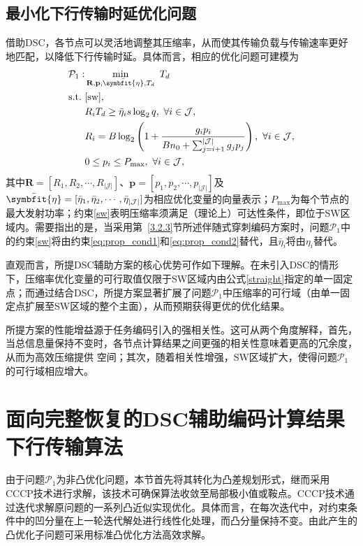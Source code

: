 \subsection{最小化下行传输时延优化问题}
借助DSC，各节点可以灵活地调整其压缩率，从而使其传输负载与传输速率更好地匹配，以降低下行传输时延。具体而言，相应的优化问题可建模为
\begin{align}
	\mathcal{P}_1:& \min_{\mathbf{R},\mathbf{p}, \bar{\symbfit{\eta}},T_d} ~T_{d}\\
	\text{s.t.}~ &\eqref{sw}\notag,\\
	&R_{i}T_d\geq \bar{\eta}_i s\log_2q,~ \forall i\in \mathcal{J},\label{sw_rt>r'}\\
	&R_i= B\log_2\left(1+\frac{g_ip_i}{Bn_0+\sum_{j=i+1}^{|\mathcal{J}|}g_jp_j}\right)\label{sic_j},~\forall i\in\mathcal{J},\\
	& 0\leq p_i\leq P_{\max}, ~\forall i\in \mathcal{J},\label{pi}
\end{align}
 其中$\mathbf{R} = [R_1, R_2, \cdots, R_{|\mathcal{J}|}]$、$\mathbf{p} = [p_1, p_2, \cdots, p_{|\mathcal{J}|}]$及$\bar{\symbfit{\eta}} = [\bar{\eta}_1, \bar{\eta}_2, \cdots, \bar{\eta}_{|\mathcal{J}|}]$为相应优化变量的向量表示；$P_{\max}$为每个节点的最大发射功率；约束\eqref{sw}表明压缩率须满足（理论上）可达性条件，即位于SW区域内。需要指出的是，当采用第~\ref{3.2.3}节所述伴随式穿刺编码方案时，问题$\mathcal{P}_1$中的约束\eqref{sw}将由约束\eqref{eq:prop_cond1}和\eqref{eq:prop_cond2}替代，且$\bar{\eta}_i$将由$\eta_i$替代。

\begin{remark}
直观而言，所提DSC辅助方案的核心优势可作如下理解。在未引入DSC的情形下，压缩率优化变量的可行取值仅限于SW区域内由公式\eqref{straight}指定的单一固定点；而通过结合DSC，所提方案显著扩展了问题$\mathcal{P}_1$中压缩率的可行域（由单一固定点扩展至SW区域的整个主面），从而预期获得更优的优化结果。
\end{remark}

\begin{remark}
	 所提方案的性能增益源于任务编码引入的强相关性。这可从两个角度解释，首先，当总信息量保持不变时，各节点计算结果之间更强的相关性意味着更高的冗余度，从而为高效压缩提供
	空间；其次，随着相关性增强，SW区域扩大，使得问题$\mathcal{P}_1$的可行域相应增大。
\end{remark}

\section{面向完整恢复的DSC辅助编码计算结果下行传输算法}\label{3.3}
由于问题$\mathcal{P}_1$为非凸优化问题，本节首先将其转化为凸差规划形式，继而采用CCCP技术进行求解，该技术可确保算法收敛至局部极小值或鞍点。CCCP技术通过迭代求解原问题的一系列凸近似实现优化。具体而言，在每次迭代中，对约束条件中的凹分量在上一轮迭代解处进行线性化处理，而凸分量保持不变。由此产生的凸优化子问题可采用标准凸优化方法高效求解。

